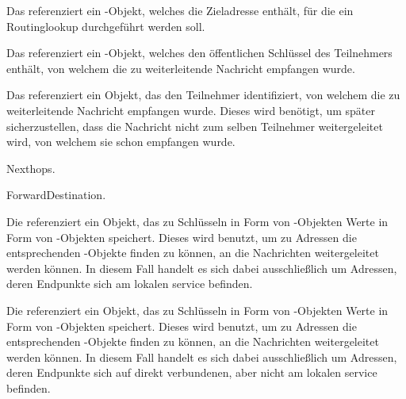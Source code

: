 \begin{description}
	
		Das \javaarg {} referenziert ein -Objekt,
		welches die Zieladresse enthält, für die ein Routinglookup durchgeführt werden soll.
	
		Das \javaarg {} referenziert ein -Objekt, welches
		den öffentlichen Schlüssel des Teilnehmers enthält, von welchem die zu weiterleitende
		Nachricht empfangen wurde.
	
		Das \javaarg {} referenziert ein Objekt, das den Teilnehmer
		identifiziert, von welchem die zu weiterleitende Nachricht empfangen wurde. Dieses wird
		benötigt, um später sicherzustellen, dass die Nachricht nicht zum selben Teilnehmer
		weitergeleitet wird, von welchem sie schon empfangen wurde.
	
		\glsdesc{Nexthops}.
	
		\glsdesc{ForwardDestination}.
	
		Die \javainstvar {} referenziert ein Objekt, das zu Schlüsseln
		in Form von -Objekten Werte in Form von -Objekten
		speichert. Dieses wird benutzt, um zu Adressen die entsprechenden
		-Objekte finden zu können, an die Nachrichten weitergeleitet werden
		können. In diesem Fall handelt es sich dabei ausschließlich um Adressen, deren Endpunkte
		sich am lokalen \gls{service} befinden.
	
		Die \javainstvar {} referenziert ein Objekt, das zu Schlüsseln
		in Form von -Objekten Werte in Form von -Objekten
		speichert. Dieses wird benutzt, um zu Adressen die entsprechenden
		-Objekte finden zu können, an die Nachrichten weitergeleitet werden
		können. In diesem Fall handelt es sich dabei ausschließlich um Adressen, deren Endpunkte
		sich auf direkt verbundenen, aber nicht am lokalen \gls{service} befinden.
	
\end{description}

